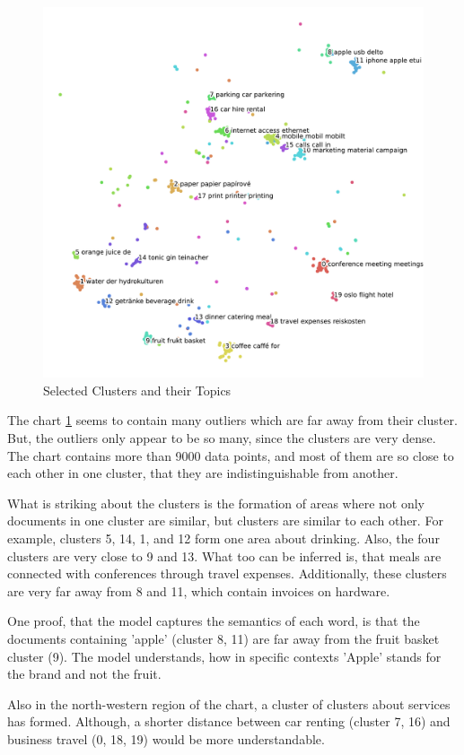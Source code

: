 \begin{figure}[!h]
	\centering
	\includegraphics[width=\textwidth]{Bilder/models/topics.pdf}
	\caption{Selected Clusters and their Topics}
	\label{fig:topics}
\end{figure}

The chart \ref{fig:topics} seems to contain many outliers which are far away from their cluster. But, the outliers only appear to be so many, since the clusters are very dense. The chart contains more than 9000 data points, and most of them are so close to each other in one cluster, that they are indistinguishable from another.

What is striking about the clusters is the formation of areas where not only documents in one cluster are similar, but clusters are similar to each other. For example, clusters 5, 14, 1, and 12 form one area about drinking. Also, the four clusters are very close to 9 and 13. What too can be inferred is, that meals are connected with conferences through travel expenses. Additionally, these clusters are very far away from 8 and 11, which contain invoices on hardware. 

One proof, that the model captures the semantics of each word, is that the documents containing 'apple' (cluster 8, 11) are far away from the fruit basket cluster (9). The model understands, how in specific contexts 'Apple' stands for the brand and not the fruit.

Also in the north-western region of the chart, a cluster of clusters about services has formed. Although, a shorter distance between car renting (cluster 7, 16) and business travel (0, 18, 19) would be more understandable.
